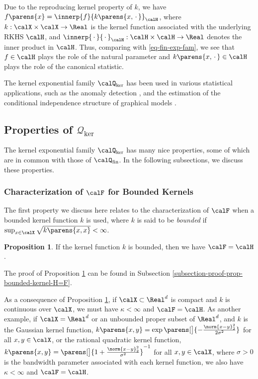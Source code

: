 \documentclass[12pt]{article}
\theoremstyle{definition}
\theoremstyle{theorem}
\newtheorem{proposition}{Proposition}
\theoremstyle{remark}
\begin{document}
Due to the reproducing kernel property of $k$, we have $f \parens{x} = \innerp{f}{k \parens{x, \,\cdot\,}}_{\calH}$, where $k: \calX \times \calX \to \Real$ is the kernel function associated with the underlying RKHS $\calH$, and $\innerp{\,\cdot\,}{\,\cdot\,}_{\calH}: \calH \times \calH \to \Real$ denotes the inner product in $\calH$. Thus, comparing with \eqref{eq-fin-exp-fam}, we see that $f \in \calH$ plays the role of the natural parameter and $k \parens{x, \,\cdot\,} \in \calH$ plays the role of the canonical statistic. 

The kernel exponential family $\calQ_{\ker}$ has been used in various statistical applications, such as the anomaly detection \parencites{Canu2006-ig}, and the estimation of the conditional independence structure of graphical models \parencites{Sun15-dc}. 


\subsection{Properties of $\mathcal{Q}_{\ker}$}


The kernel exponential family $\calQ_{\ker}$ has many nice properties, some of which are in common with those of $\calQ_{\mathrm{fin}}$. In the following subsections, we discuss these properties. 

\subsubsection{Characterization of $\calF$ for Bounded Kernels}

The first property we discuss here relates to the characterization of $\calF$ when a bounded kernel function $k$ is used, where $k$ is said to be \emph{bounded} if $\sup_{x \in \calX} \sqrt{k \parens{x, x}} < \infty$. 

\begin{proposition}\label{prop-bounded-kernel-H=F}
	If the kernel function $k$ is bounded, then we have $\calF = \calH$. 
\end{proposition}

The proof of Proposition \ref{prop-bounded-kernel-H=F} can be found in Subsection \ref{subsection-proof-prop-bounded-kernel-H=F}. 

As a consequence of Proposition \ref{prop-bounded-kernel-H=F}, if $\calX \subset \Real^d$ is compact and $k$ is continuous over $\calX$, we must have $\kappa < \infty$ and $\calF = \calH$. As another example, if $\calX = \Real^d$ or an unbounded proper subset of $\Real^d$, and $k$ is the Gaussian kernel function, $k \parens{x, y} = \exp \parens[\big]{- \frac{\norm{x - y}_2^2}{2 \sigma^2}}$ for all $x, y \in \calX$, or the rational quadratic kernel function, $k \parens{x, y} = \parens[\big]{1 + \frac{\norm{x - y}_2^2}{\sigma^2}}^{-1}$ for all $x, y \in \calX$, 
	where $\sigma > 0$ is the bandwidth parameter associated with each kernel function, we also have $\kappa < \infty$ and $\calF = \calH$. 
\end{document}
